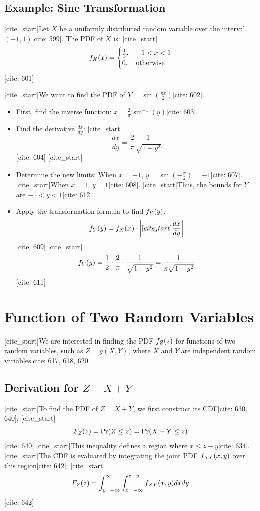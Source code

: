 \documentclass[11pt]{article}
\begin{document}
\subsection{Example: Sine Transformation}
[cite_start]Let $X$ be a uniformly distributed random variable over the interval $(-1, 1)$[cite: 599]. The PDF of $X$ is:
[cite_start]$$f\sb{X}(x) = \begin{cases} \frac{1}{2}, & -1 < x < 1 \\ 0, & \text{otherwise} \end{cases}$$ [cite: 601]

[cite_start]We want to find the PDF of $Y = \sin(\frac{\pi x}{2})$[cite: 602].
\begin{itemize}
    [cite_start]\item \leavevmode First, find the inverse function: $x = \frac{2}{\pi} \sin^{-1}(y)$[cite: 603].
    \item \leavevmode Find the derivative $\frac{dx}{dy}$:
    [cite_start]$$\frac{dx}{dy} = \frac{2}{\pi} \frac{1}{\sqrt{1 - y^2}}$$ [cite: 604]
    [cite_start]\item \leavevmode Determine the new limits: When $x = -1$, $y = \sin(-\frac{\pi}{2}) = -1$[cite: 607]. [cite_start]When $x = 1$, $y = 1$[cite: 608]. [cite_start]Thus, the bounds for $Y$ are $-1 < y < 1$[cite: 612].
    \item \leavevmode Apply the transformation formula to find $f\sb{Y}(y)$:
    $$f\sb{Y}(y) = f\sb{X}(x) \cdot \left| [cite_start]\frac{dx}{dy} \right|$$ [cite: 609]
    [cite_start]$$f\sb{Y}(y) = \frac{1}{2} \cdot \frac{2}{\pi} \cdot \frac{1}{\sqrt{1 - y^2}} = \frac{1}{\pi \sqrt{1 - y^2}}$$ [cite: 611]
\end{itemize}

\section{Function of Two Random Variables}
[cite_start]We are interested in finding the PDF $f\sb{Z}(z)$ for functions of two random variables, such as $Z = g(X,Y)$, where $X$ and $Y$ are independent random variables[cite: 617, 618, 620].

\subsection{Derivation for $Z = X + Y$}
[cite_start]To find the PDF of $Z = X + Y$, we first construct its CDF[cite: 630, 640]:
[cite_start]$$F\sb{Z}(z) = \Pr(Z \le z) = \Pr(X + Y \le z)$$ [cite: 640]
[cite_start]This inequality defines a region where $x \le z - y$[cite: 634]. [cite_start]The CDF is evaluated by integrating the joint PDF $f\sb{XY}(x,y)$ over this region[cite: 642]:
[cite_start]$$F\sb{Z}(z) = \int\sb{y=-\infty}^{\infty} \int\sb{x=-\infty}^{z-y} f\sb{XY}(x,y) dx dy$$ [cite: 642]
\end{document}
